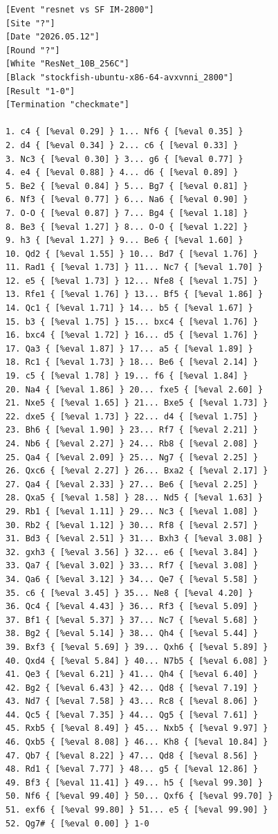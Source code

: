 \begin{verbatim}
[Event "resnet vs SF IM-2800"]
[Site "?"]
[Date "2026.05.12"]
[Round "?"]
[White "ResNet_10B_256C"]
[Black "stockfish-ubuntu-x86-64-avxvnni_2800"]
[Result "1-0"]
[Termination "checkmate"]

1. c4 { [%eval 0.29] } 1... Nf6 { [%eval 0.35] } 
2. d4 { [%eval 0.34] } 2... c6 { [%eval 0.33] } 
3. Nc3 { [%eval 0.30] } 3... g6 { [%eval 0.77] } 
4. e4 { [%eval 0.88] } 4... d6 { [%eval 0.89] } 
5. Be2 { [%eval 0.84] } 5... Bg7 { [%eval 0.81] } 
6. Nf3 { [%eval 0.77] } 6... Na6 { [%eval 0.90] } 
7. O-O { [%eval 0.87] } 7... Bg4 { [%eval 1.18] } 
8. Be3 { [%eval 1.27] } 8... O-O { [%eval 1.22] } 
9. h3 { [%eval 1.27] } 9... Be6 { [%eval 1.60] } 
10. Qd2 { [%eval 1.55] } 10... Bd7 { [%eval 1.76] } 
11. Rad1 { [%eval 1.73] } 11... Nc7 { [%eval 1.70] } 
12. e5 { [%eval 1.73] } 12... Nfe8 { [%eval 1.75] } 
13. Rfe1 { [%eval 1.76] } 13... Bf5 { [%eval 1.86] } 
14. Qc1 { [%eval 1.71] } 14... b5 { [%eval 1.67] } 
15. b3 { [%eval 1.75] } 15... bxc4 { [%eval 1.76] } 
16. bxc4 { [%eval 1.72] } 16... d5 { [%eval 1.76] } 
17. Qa3 { [%eval 1.87] } 17... a5 { [%eval 1.89] } 
18. Rc1 { [%eval 1.73] } 18... Be6 { [%eval 2.14] } 
19. c5 { [%eval 1.78] } 19... f6 { [%eval 1.84] } 
20. Na4 { [%eval 1.86] } 20... fxe5 { [%eval 2.60] } 
21. Nxe5 { [%eval 1.65] } 21... Bxe5 { [%eval 1.73] } 
22. dxe5 { [%eval 1.73] } 22... d4 { [%eval 1.75] } 
23. Bh6 { [%eval 1.90] } 23... Rf7 { [%eval 2.21] } 
24. Nb6 { [%eval 2.27] } 24... Rb8 { [%eval 2.08] } 
25. Qa4 { [%eval 2.09] } 25... Ng7 { [%eval 2.25] } 
26. Qxc6 { [%eval 2.27] } 26... Bxa2 { [%eval 2.17] } 
27. Qa4 { [%eval 2.33] } 27... Be6 { [%eval 2.25] } 
28. Qxa5 { [%eval 1.58] } 28... Nd5 { [%eval 1.63] } 
29. Rb1 { [%eval 1.11] } 29... Nc3 { [%eval 1.08] } 
30. Rb2 { [%eval 1.12] } 30... Rf8 { [%eval 2.57] } 
31. Bd3 { [%eval 2.51] } 31... Bxh3 { [%eval 3.08] } 
32. gxh3 { [%eval 3.56] } 32... e6 { [%eval 3.84] } 
33. Qa7 { [%eval 3.02] } 33... Rf7 { [%eval 3.08] } 
34. Qa6 { [%eval 3.12] } 34... Qe7 { [%eval 5.58] } 
35. c6 { [%eval 3.45] } 35... Ne8 { [%eval 4.20] }
36. Qc4 { [%eval 4.43] } 36... Rf3 { [%eval 5.09] } 
37. Bf1 { [%eval 5.37] } 37... Nc7 { [%eval 5.68] } 
38. Bg2 { [%eval 5.14] } 38... Qh4 { [%eval 5.44] } 
39. Bxf3 { [%eval 5.69] } 39... Qxh6 { [%eval 5.89] } 
40. Qxd4 { [%eval 5.84] } 40... N7b5 { [%eval 6.08] } 
41. Qe3 { [%eval 6.21] } 41... Qh4 { [%eval 6.40] } 
42. Bg2 { [%eval 6.43] } 42... Qd8 { [%eval 7.19] } 
43. Nd7 { [%eval 7.58] } 43... Rc8 { [%eval 8.06] } 
44. Qc5 { [%eval 7.35] } 44... Qg5 { [%eval 7.61] }
45. Rxb5 { [%eval 8.49] } 45... Nxb5 { [%eval 9.97] } 
46. Qxb5 { [%eval 8.08] } 46... Kh8 { [%eval 10.84] } 
47. Qb7 { [%eval 8.22] } 47... Qd8 { [%eval 8.56] } 
48. Rd1 { [%eval 7.77] } 48... g5 { [%eval 12.86] } 
49. Bf3 { [%eval 11.41] } 49... h5 { [%eval 99.30] } 
50. Nf6 { [%eval 99.40] } 50... Qxf6 { [%eval 99.70] } 
51. exf6 { [%eval 99.80] } 51... e5 { [%eval 99.90] }
52. Qg7# { [%eval 0.00] } 1-0
\end{verbatim}
